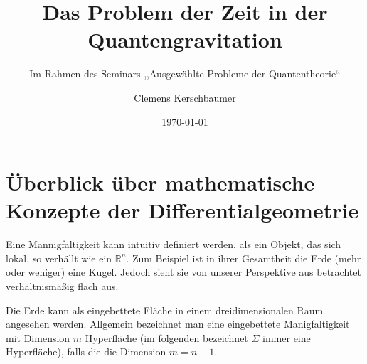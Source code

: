 \documentclass{scrartcl}
\title{Das Problem der Zeit in der Quantengravitation}
\subtitle{Im Rahmen des Seminars ,,Ausgewählte Probleme der Quantentheorie``}
\author{Clemens Kerschbaumer}
\date{\today}
\begin{document}
	\maketitle
	\section{Überblick über mathematische Konzepte der Differentialgeometrie}
		Eine Mannigfaltigkeit kann intuitiv definiert werden, als ein Objekt, das sich lokal, so verhällt wie ein $\mathbb{R}^n$. Zum Beispiel
		ist in ihrer Gesamtheit die Erde (mehr oder weniger) eine Kugel. Jedoch sieht sie von unserer Perspektive aus betrachtet verhältnismäßig flach aus.
		
		Die Erde kann als eingebettete Fläche in einem dreidimensionalen Raum angesehen werden.
		Allgemein bezeichnet man eine eingebettete Manigfaltigkeit mit Dimension $m$ Hyperfläche
		(im folgenden bezeichnet $\Sigma$ immer eine Hyperfläche), falls die die Dimension $m=n-1$. 
		
\end{document}
